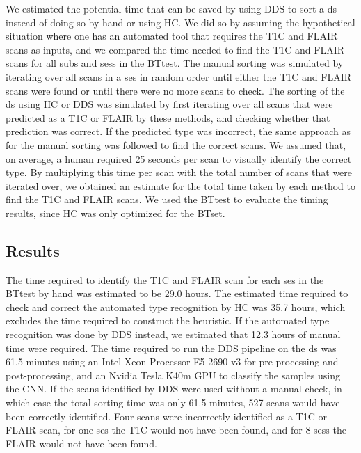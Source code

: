 \begin{subappendices}
We estimated the potential time that can be saved by using \gls{DDS} to sort a \gls{ds} instead of doing so by hand or using \gls{HC}.
We did so by assuming the hypothetical situation where one has an automated tool that requires the \gls{T1C} and \gls{FLAIR} \glspl{scan} as inputs, and we compared the time needed to find the \gls{T1C} and \gls{FLAIR} \glspl{scan} for all \glspl{sub} and \glspl{ses} in the \gls{BTtest}.
The manual sorting was simulated by iterating over all \glspl{scan} in a \gls{ses} in random order until either the \gls{T1C} and \gls{FLAIR} \glspl{scan} were found or until there were no more \glspl{scan} to check.
The sorting of the \gls{ds} using \gls{HC} or \gls{DDS} was simulated by first iterating over all \glspl{scan} that were predicted as a \gls{T1C} or \gls{FLAIR} by these methods, and checking whether that prediction was correct.
If the predicted \gls{type} was incorrect, the same approach as for the manual sorting was followed to find the correct \glspl{scan}.
We assumed that, on average, a human required 25 seconds per \gls{scan} to visually identify the correct \gls{type}.
By multiplying this time per \gls{scan} with the total number of \glspl{scan} that were iterated over, we obtained an estimate for the total time taken by each method to find the \gls{T1C} and \gls{FLAIR} \glspl{scan}.
We used the \gls{BTtest} to evaluate the timing results, since \gls{HC} was only optimized for the \gls{BTset}.

\subsection{Results}
The time required to identify the \gls{T1C} and \gls{FLAIR} \gls{scan} for each \gls{ses} in the \gls{BTtest} by hand was estimated to be 29.0 hours.
The estimated time required to check and correct the automated \gls{type} recognition by \gls{HC} was 35.7 hours, which excludes the time required to construct the heuristic.
If the automated \gls{type} recognition was done by \gls{DDS} instead, we estimated that 12.3 hours of manual time were required.
The time required to run the \gls{DDS} pipeline on the \gls{ds} was 61.5 minutes using an Intel Xeon Processor E5-2690 v3 for pre-processing and post-processing, and an Nvidia Tesla K40m GPU to classify the \glspl{sample} using the \gls{CNN}.
If the \glspl{scan} identified by \gls{DDS} were used without a manual check, in which case the total sorting time was only 61.5 minutes, 527 \glspl{scan} would have been correctly identified.
Four \glspl{scan} were incorrectly identified as a \gls{T1C} or \gls{FLAIR} \gls{scan}, for one \gls{ses} the \gls{T1C} would not have been found, and for 8 \glspl{ses} the \gls{FLAIR} would not have been found.


\end{subappendices}
